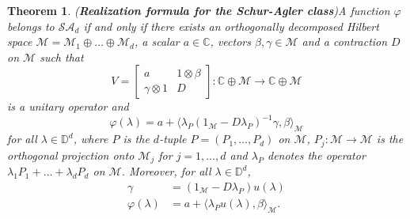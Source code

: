 \documentclass[11pt, reqno]{amsart}
\newtheorem{theorem}{Theorem}[section]
\newcommand\1{\boldsymbol {1}}
\numberwithin{equation}{section}
\begin{document}
\begin{theorem}{ ({\bf{Realization formula for the Schur-Agler class}})}\label{realizationtheoremschuragler}
    A function $\varphi$ belongs to $\mathcal{SA}_{d}$ if and only if there exists  an orthogonally decomposed Hilbert space 
    $\mathcal{M}=\mathcal{M}_{1}\oplus\hdots\oplus\mathcal{M}_{d}$,  a scalar $a\in\mathbb{C}$, vectors $\beta,\gamma\in\mathcal{M}$ and a contraction $D$ on $\mathcal{M}$ such that
    $$V = \begin{bmatrix}
        a & 1\otimes \beta \\
        \gamma\otimes 1 & D 
    \end{bmatrix} : \mathbb{C}\oplus \mathcal{M}\rightarrow \mathbb{C}\oplus \mathcal{M}$$
 is a unitary operator and
\begin{equation}\label{aglerrealizations}
\varphi(\lambda)=a+\langle \lambda_{P}(1_{\mathcal{M}}-D\lambda_{P})^{-1}\gamma,\beta\rangle_{\mathcal{M}}
\end{equation}  
for all $\lambda\in\mathbb{D}^{d}$, where $P$ is the $d$-tuple $P=(P_{1},\hdots,P_{d})$ on $\mathcal{M}$,  $P_{j}:\mathcal{M}\rightarrow\mathcal{M}$ is the orthogonal projection onto $\mathcal{M}_{j}$ for $j=1,\hdots,d$ and $\lambda_{P}$ denotes the operator $\lambda_{1}P_{1}+\hdots+\lambda_{d}P_{d}$ on $\mathcal{M}$. Moreover, for all $\lambda\in\mathbb{D}^{d}$,
\begin{align}
\gamma & =( 1_{\mathcal{M}}-D \lambda_{P} ) u(\lambda) \label{gamma-D-u}\\
\varphi(\lambda) &=a+\langle \lambda_{P}u(\lambda),\beta\rangle_{\mathcal{M}}.
\end{align}
\end{theorem}
\end{document}
